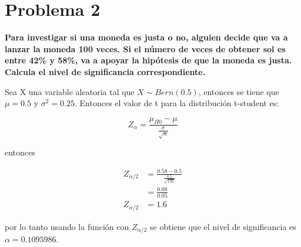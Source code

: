 \section*{Problema 2}

\textbf{Para investigar si una moneda es justa o no, alguien decide que va a lanzar la moneda 100 veces. Si el número de veces de obtener sol es entre 42\% y 58\%, va a apoyar la hipótesis de que la moneda es justa. Calcula el nivel de significancia correspondiente.}


Sea X una variable aleatoria tal que $X\sim Bern(0.5)$, entonces se tiene que $\mu=0.5$ y $\sigma^2 = 0.25$. Entonces el valor de  t para la distribución t-student es:

\begin{equation*}
    Z_{\alpha} = \frac{\mu_{H0}-\mu}{\frac{\sigma}{\sqrt{n}}}
\end{equation*}

entonces

\begin{align*}
    Z_{\alpha/2} & = \frac{0.58-0.5}{\frac{0.5}{\sqrt{100}}} \\
                 & = \frac{0.08}{0.05}                       \\
    Z_{\alpha/2} & = 1.6
\end{align*}

por lo tanto usando la función  con $Z_{\alpha/2}$ se obtiene que el nivel de significancia es $\alpha=0.1095986$.